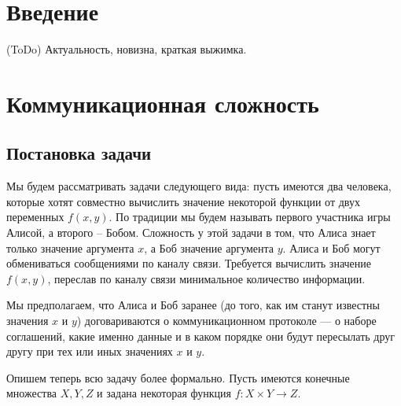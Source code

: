 \documentclass[a4paper]{article}
\begin{document}
\newpage

\tableofcontents

\newpage
 
\newpage

\setcounter{mclaim}{0}
\setcounter{mlemma}{0}
\setcounter{mtheorem}{0}
\setcounter{section}{0}
\section*{Введение}
(ToDo) Актуальность, новизна, краткая выжимка.

\addtocounter{section}{1}
\section*{Коммуникационная сложность}
\setcounter{subsection}{0}

\subsection{Постановка задачи}
Мы будем рассматривать задачи следующего вида: пусть имеются два человека, которые хотят совместно
вычислить значение некоторой функции от двух переменных $f(x, y)$. По традиции мы будем называть
первого участника игры Алисой, а второго -- Бобом. Сложность у этой задачи в том, что Алиса знает только
значение аргумента $x$, а Боб значение аргумента $y$. Алиса и Боб могут обмениваться сообщениями 
по каналу связи. Требуется вычислить значение $f(x, y)$, переслав по каналу связи минимальное
количество информации.

Мы предполагаем, что Алиса и Боб заранее (до того, как им станут известны значения $x$ и $y$)
договариваются о коммуникационном протоколе --- о наборе соглашений, какие именно данные и
в каком порядке они будут пересылать друг другу при тех или иных значениях $x$ и $y$.

Опишем теперь всю задачу более формально. Пусть имеются конечные множества $X, Y, Z$ и задана
некоторая функция $f:X\times Y\rightarrow Z$.
\end{document}
